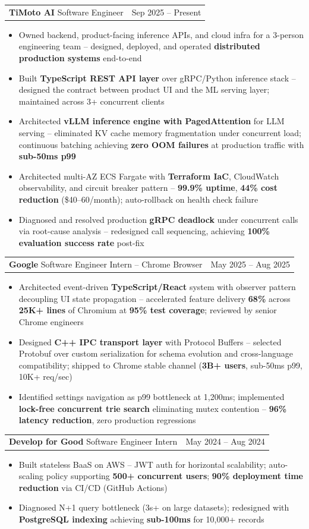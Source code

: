 \documentclass[letterpaper,11pt]{article}
\makeatletter
\newcommand{\resumeItem}[1]{
  \item\small{{#1 \vspace{-2pt}}}
}
\newcommand{\resumeSubheadingShortSplit}[3]{%
  \vspace{-2pt}\item
    \begin{tabular*}{0.98\textwidth}[t]{l@{\extracolsep{\fill}}r}
      {\normalsize\textbf{#1}} \textbar{} {\normalsize #2} & {\normalsize #3} \\
    \end{tabular*}\vspace{-7pt}
}
\newcommand{\resumeItemListStart}{\begin{itemize}}
\newcommand{\resumeItemListEnd}{\end{itemize}\vspace{-5pt}}
\makeatother
\begin{document}
    \resumeSubheadingShortSplit
      {TiMoto AI}{Software Engineer}{Sep 2025 -- Present}
        \resumeItemListStart
          \resumeItem{Owned backend, product-facing inference APIs, and cloud infra for a 3-person engineering team -- designed, deployed, and operated \textbf{distributed production systems} end-to-end}
          \resumeItem{Built \textbf{TypeScript REST API layer} over gRPC/Python inference stack -- designed the contract between product UI and the ML serving layer; maintained across 3+ concurrent clients}
          \resumeItem{Architected \textbf{vLLM inference engine with PagedAttention} for LLM serving -- eliminated KV cache memory fragmentation under concurrent load; continuous batching achieving \textbf{zero OOM failures} at production traffic with \textbf{sub-50ms p99}}
          \resumeItem{Architected multi-AZ ECS Fargate with \textbf{Terraform IaC}, CloudWatch observability, and circuit breaker pattern -- \textbf{99.9\% uptime}, \textbf{44\% cost reduction} (\$40--60/month); auto-rollback on health check failure}
          \resumeItem{Diagnosed and resolved production \textbf{gRPC deadlock} under concurrent calls via root-cause analysis -- redesigned call sequencing, achieving \textbf{100\% evaluation success rate} post-fix}
      \resumeItemListEnd

    \resumeSubheadingShortSplit
      {Google}{Software Engineer Intern -- Chrome Browser}{May 2025 -- Aug 2025}
      \resumeItemListStart
        \resumeItem{Architected event-driven \textbf{TypeScript/React} system with observer pattern decoupling UI state propagation -- accelerated feature delivery \textbf{68\%} across \textbf{25K+ lines} of Chromium at \textbf{95\% test coverage}; reviewed by senior Chrome engineers}
        \resumeItem{Designed \textbf{C++ IPC transport layer} with Protocol Buffers -- selected Protobuf over custom serialization for schema evolution and cross-language compatibility; shipped to Chrome stable channel (\textbf{3B+ users}, sub-50ms p99, 10K+ req/sec)}
        \resumeItem{Identified settings navigation as p99 bottleneck at 1,200ms; implemented \textbf{lock-free concurrent trie search} eliminating mutex contention -- \textbf{96\% latency reduction}, zero production regressions}
      \resumeItemListEnd

    \resumeSubheadingShortSplit
      {Develop for Good}{Software Engineer Intern}{May 2024 -- Aug 2024}
      \resumeItemListStart
        \resumeItem{Built stateless BaaS on AWS -- JWT auth for horizontal scalability; auto-scaling policy supporting \textbf{500+ concurrent users}; \textbf{90\% deployment time reduction} via CI/CD (GitHub Actions)}
        \resumeItem{Diagnosed N+1 query bottleneck (3s+ on large datasets); redesigned with \textbf{PostgreSQL indexing} achieving \textbf{sub-100ms} for 10,000+ records}
      \resumeItemListEnd
\end{document}
